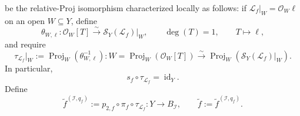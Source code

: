 \begin{definition}
\[  \]
  be the relative-Proj isomorphism characterized locally as follows: if
  $\mathcal L_f|_W=\mathcal O_W\ell$ on an open $W\subseteq Y$, define
  \[
    \theta_{W,\ell}\colon\mathcal O_W[T]\xrightarrow{\sim}
      \mathcal S_Y(\mathcal L_f)|_W,
    \qquad \deg(T)=1,\qquad T\longmapsto\ell,
  \]
  and require
  \[
    \tau_{\mathcal L_f}|_W
      :=\operatorname{Proj}_W(\theta_{W,\ell}^{-1})
      \colon W=\operatorname{Proj}_W(\mathcal O_W[T])
      \xrightarrow{\sim}
      \operatorname{Proj}_W(\mathcal S_Y(\mathcal L_f)|_W).
  \]
  In particular,
  \[
    s_f\circ\tau_{\mathcal L_f}=\operatorname{id}_Y.          \tag{UL4}
  \]
  Define
  \[
    \widetilde f^{(\mathcal I,q_f)}
      :=p_{2,f}\circ\pi_f\circ\tau_{\mathcal L_f}
      \colon Y\longrightarrow B_{\mathcal I},\qquad
    \widetilde f:=\widetilde f^{(\mathcal I,q_f)}.            \tag{UL5}
  \]
\end{definition}

